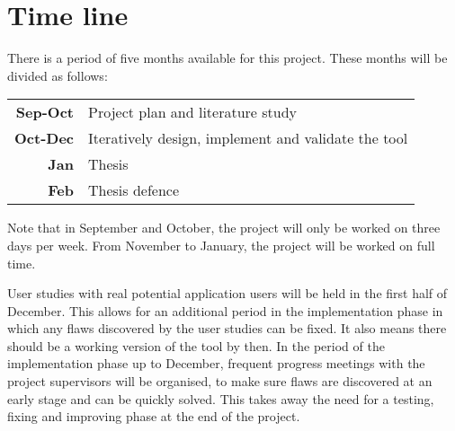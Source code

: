 \section{Time line}

There is a period of five months available for this project. These months will be divided as follows:

\noindent
\begin{tabular}{r|l}
\textbf{Sep-Oct} & Project plan and literature study\\
\textbf{Oct-Dec} & Iteratively design, implement and validate the tool\\
\textbf{Jan} & Thesis\\
\textbf{Feb} & Thesis defence
\end{tabular}

\noindent
Note that in September and October, the project will only be worked on three days per week. From November to January, the project will be worked on full time.

User studies with real potential application users will be held in the first half of December. This allows for an additional period in the implementation phase in which any flaws discovered by the user studies can be fixed. It also means there should be a working version of the tool by then. In the period of the implementation phase up to December, frequent progress meetings with the project supervisors will be organised, to make sure flaws are discovered at an early stage and can be quickly solved. This takes away the need for a testing, fixing and improving phase at the end of the project.
